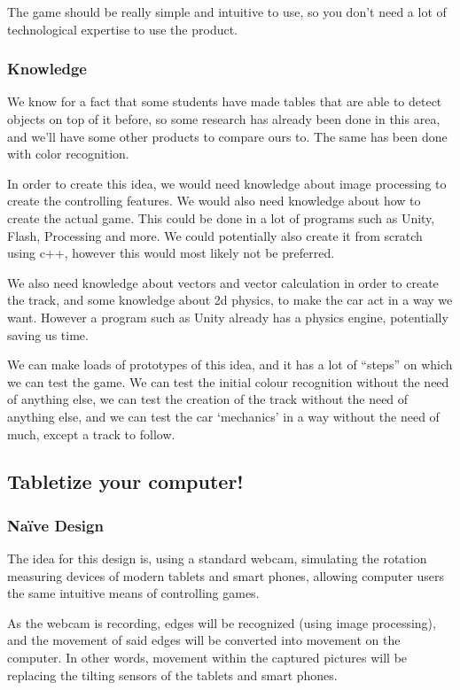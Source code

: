 The game should be really simple and intuitive to use, so you don’t need a lot of technological expertise to use the product.

\subsubsection*{Knowledge}
We know for a fact that some students have made tables that are able to detect objects on top of it before, so some research has already been done in this area, and we’ll have some other products to compare ours to. The same has been done with color recognition.
\bigskip

In order to create this idea, we would need knowledge about image processing to create the controlling features. We would also need knowledge about how to create the actual game. This could be done in a lot of programs such as Unity, Flash, Processing and more. We could potentially also create it from scratch using c++, however this would most likely not be preferred.
\bigskip

We also need knowledge about vectors and vector calculation in order to create the track, and some knowledge about 2d physics, to make the car act in a way we want. However a program such as Unity already has a physics engine, potentially saving us time.
\bigskip

We can make loads of prototypes of this idea, and it has a lot of “steps” on which we can test the game. We can test the initial colour recognition without the need of anything else, we can test the creation of the track without the need of anything else, and we can test the car ‘mechanics’ in a way without the need of much, except a track to follow.

\pagebreak

\subsection{Tabletize your computer!} \label{nd7}
\subsubsection*{Naïve Design}
The idea for this design is, using a standard webcam, simulating the rotation measuring devices of modern tablets and smart phones, allowing computer users the same intuitive means of controlling games.
\bigskip

As the webcam is recording, edges will be recognized (using image processing), and the movement of said edges will be converted into movement on the computer. In other words, movement within the captured pictures will be replacing the tilting sensors of the tablets and smart phones.

